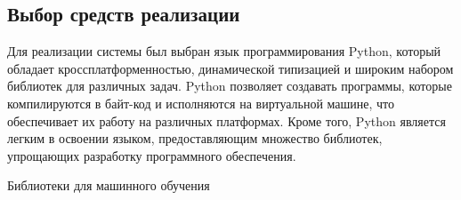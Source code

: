 \subsection*{
  \gostTitleFont
   Выбор средств реализации
}

\subtitlespace

{\gostFont

  \par \redline  Для реализации системы был выбран язык программирования Python, который обладает кроссплатформенностью, динамической типизацией и широким набором библиотек для различных задач. Python позволяет создавать программы, которые компилируются в байт-код и исполняются на виртуальной машине, что обеспечивает их работу на различных платформах. Кроме того, Python является легким в освоении языком, предоставляющим множество библиотек, упрощающих разработку программного обеспечения.

  \par \redline Библиотеки для машинного обучения

}
